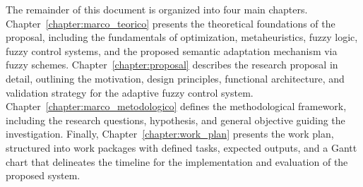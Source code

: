 The remainder of this document is organized into four main chapters. Chapter~\ref{chapter:marco_teorico} presents the theoretical foundations of the proposal, including the fundamentals of optimization, metaheuristics, fuzzy logic, fuzzy control systems, and the proposed semantic adaptation mechanism via fuzzy schemes. Chapter~\ref{chapter:proposal} describes the research proposal in detail, outlining the motivation, design principles, functional architecture, and validation strategy for the adaptive fuzzy control system. Chapter~\ref{chapter:marco_metodologico} defines the methodological framework, including the research questions, hypothesis, and general objective guiding the investigation. Finally, Chapter~\ref{chapter:work_plan} presents the work plan, structured into work packages with defined tasks, expected outputs, and a Gantt chart that delineates the timeline for the implementation and evaluation of the proposed system.